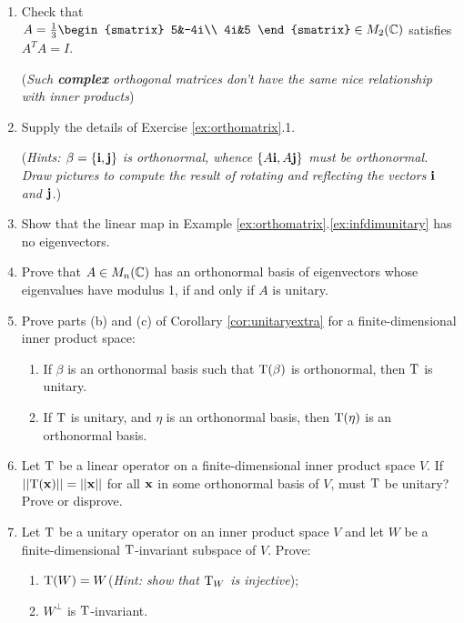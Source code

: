 \begin{exercises}
\begin{enumerate}
	  
	  \item\label{ex:comporth} Check that $A=\frac 13
	  \begin{smatrix}
			5&-4i\\
			4i&5
	  \end{smatrix}
	  \in M_2(\C)$ satisfies $A^TA=I$.\par
	  (\emph{Such \textbf{complex} orthogonal matrices don't have the same nice relationship with inner products}) 
	  
	  
	  \item\label{ex:rotrefmatrix} Supply the details of Exercise \ref{ex:orthomatrix}.1.\par
	  (\emph{Hints: $\beta=\{{\mathbf{i}},{\mathbf{j}}\}$ is orthonormal, whence $\{A{\mathbf{i}},A{\mathbf{j}}\}$ must be orthonormal. Draw pictures to compute the result of rotating and reflecting the vectors ${\mathbf{i}}$ and ${\mathbf{j}}$.})
	  
		
		\item Show that the linear map in Example \ref*{ex:orthomatrix}.\ref{ex:infdimunitary} has no eigenvectors.
		
	  
	  \item\label{ex:unitarymatrix} Prove that $A\in M_n(\mathbb{C})$ has an orthonormal basis of eigenvectors whose eigenvalues have modulus 1, if and only if $A$ is unitary.
	  
	  
	  \item\label{ex:orthbasis} Prove parts (b) and (c) of Corollary \ref{cor:unitaryextra} for a finite-dimensional inner product space:
	  \begin{enumerate}
	    \item If $\beta$ is an orthonormal basis such that $\mathrm{T}(\beta)$ is orthonormal, then $\mathrm{T}$ is unitary.
	    \item If $\mathrm{T}$ is unitary, and $\eta$ is an orthonormal basis, then $\mathrm{T}(\eta)$ is an orthonormal basis.
	  \end{enumerate}
	  
	  
	  \item Let $\mathrm{T}$ be a linear operator on a finite-dimensional inner product space $V$. If $\left| \left| \mathrm{T}({\mathbf{x}})\right|\right|=\left| \left| {\mathbf{x}}\right|\right|$ for all ${\mathbf{x}}$ in some orthonormal basis of $V$, must $\mathrm{T}$ be unitary? Prove or disprove.
	  
	  
	  \item Let $\mathrm{T}$ be a unitary operator on an inner product space $V$ and let $W$ be a finite-dimensional $\mathrm{T}$-invariant subspace of $V$. Prove:
	  \begin{enumerate}
	    \item $\mathrm{T}(W)=W$\quad (\emph{Hint: show that $\mathrm{T}_{W}$ is injective});
	    \item $W^\perp$ is $\mathrm{T}$-invariant.
		\end{enumerate}
		

\end{enumerate}
\end{exercises}
